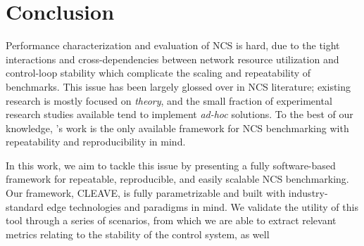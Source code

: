 \section{Conclusion}\label{sec:conclusion}

Performance characterization and evaluation of \acl{NCS} is hard, due to the tight interactions and cross-dependencies between network resource utilization and control-loop stability which complicate the scaling and repeatability of benchmarks.
This issue has been largely glossed over in \ac{NCS} literature; existing research is mostly focused on \emph{theory}, and the small fraction of experimental research studies available tend to implement \emph{ad-hoc} solutions.
To the best of our knowledge, \textcite{Zoppi2020NCSBench}'s work is the only available framework for \ac{NCS} benchmarking with repeatability and reproducibility in mind.

In this work, we aim to tackle this issue by presenting a fully software-based framework for repeatable, reproducible, and easily scalable \ac{NCS} benchmarking.
Our framework, \ac{CLEAVE}, is fully parametrizable and built with industry-standard edge technologies and paradigms in mind.
We validate the utility of this tool through a series of scenarios, from which we are able to extract relevant metrics relating to the stability of the control system, as well 






